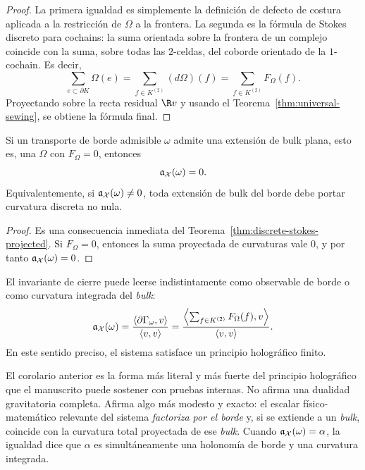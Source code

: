 \begin{proof}
La primera igualdad es simplemente la definición de defecto de costura aplicada a la restricción de
$\Omega$ a la frontera. La segunda es la fórmula de Stokes discreto para cochains: la suma orientada
sobre la frontera de un complejo coincide con la suma, sobre todas las $2$-celdas, del coborde
orientado de la $1$-cochain. Es decir,
\[
\sum_{e\subset \partial K}\Omega(e)=\sum_{f\in K^{(2)}}(d\Omega)(f)=\sum_{f\in K^{(2)}}F_\Omega(f).
\]
Proyectando sobre la recta residual $\R v$ y usando el
Teorema~\ref{thm:universal-sewing}, se obtiene la fórmula final.
\end{proof}

\begin{corollary}\label{cor:no-flat-bulk}
Si un transporte de borde admisible $\omega$ admite una extensión de bulk plana,
esto es, una $\Omega$ con $F_\Omega=0$, entonces
\[
\mathfrak a_\mathcal X(\omega)=0.
\]
Equivalentemente, si $\mathfrak a_\mathcal X(\omega)\neq 0$, toda extensión de bulk del borde debe portar
curvatura discreta no nula.
\end{corollary}

\begin{proof}
Es una consecuencia inmediata del Teorema~\ref{thm:discrete-stokes-projected}. Si
$F_\Omega=0$, entonces la suma proyectada de curvaturas vale $0$, y por tanto
$\mathfrak a_\mathcal X(\omega)=0$.
\end{proof}

\begin{corollary}\label{cor:finite-holography}
El invariante de cierre puede leerse indistintamente como observable de borde o como curvatura
integrada del \emph{bulk}:
\[
\mathfrak a_\mathcal X(\omega)
=
\frac{\langle \partial\Gamma_\omega,v\rangle}{\langle v,v\rangle}
=
\frac{\left\langle \sum_{f\in K^{(2)}}F_\Omega(f),v\right\rangle}{\langle v,v\rangle}.
\]
En este sentido preciso, el sistema satisface un principio holográfico finito.
\end{corollary}

\begin{remark}
El corolario anterior es la forma más literal y más fuerte del principio holográfico que el manuscrito
puede sostener con pruebas internas. No afirma una dualidad gravitatoria completa. Afirma algo más
modesto y exacto: el escalar físico-matemático relevante del sistema \emph{factoriza por el borde} y,
si se extiende a un \emph{bulk}, coincide con la curvatura total proyectada de ese \emph{bulk}.
Cuando $\mathfrak a_\mathcal X(\omega)=\alpha$, la igualdad dice que $\alpha$ es simultáneamente una holonomía
de borde y una curvatura integrada.
\end{remark}

